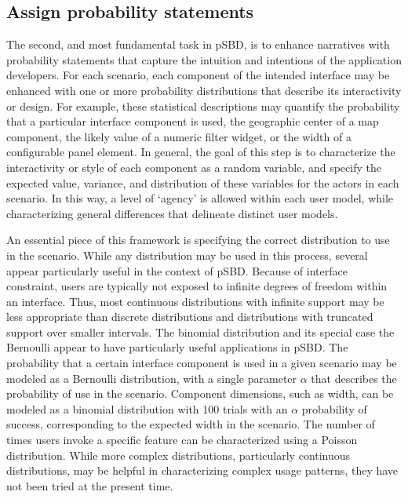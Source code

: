 \documentclass[]{article}
\begin{document}
\subsection{Assign probability
statements}\label{assign-probability-statements}

The second, and most fundamental task in pSBD, is to enhance narratives
with probability statements that capture the intuition and intentions of
the application developers. For each scenario, each component of the
intended interface may be enhanced with one or more probability
distributions that describe its interactivity or design. For example,
these statistical descriptions may quantify the probability that a
particular interface component is used, the geographic center of a map
component, the likely value of a numeric filter widget, or the width of
a configurable panel element. In general, the goal of this step is to
characterize the interactivity or style of each component as a random
variable, and specify the expected value, variance, and distribution of
these variables for the actors in each scenario. In this way, a level of
`agency' is allowed within each user model, while characterizing general
differences that delineate distinct user models.

An essential piece of this framework is specifying the correct
distribution to use in the scenario. While any distribution may be used
in this process, several appear particularly useful in the context of
pSBD. Because of interface constraint, users are typically not exposed
to infinite degrees of freedom within an interface. Thus, most
continuous distributions with infinite support may be less appropriate
than discrete distributions and distributions with truncated support
over smaller intervals. The binomial distribution and its special case
the Bernoulli appear to have particularly useful applications in pSBD.
The probability that a certain interface component is used in a given
scenario may be modeled as a Bernoulli distribution, with a single
parameter \(\alpha\) that describes the probability of use in the
scenario. Component dimensions, such as width, can be modeled as a
binomial distribution with 100 trials with an \(\alpha\) probability of
success, corresponding to the expected width in the scenario. The number
of times users invoke a specific feature can be characterized using a
Poisson distribution. While more complex distributions, particularly
continuous distributions, may be helpful in characterizing complex usage
patterns, they have not been tried at the present time.
\end{document}
